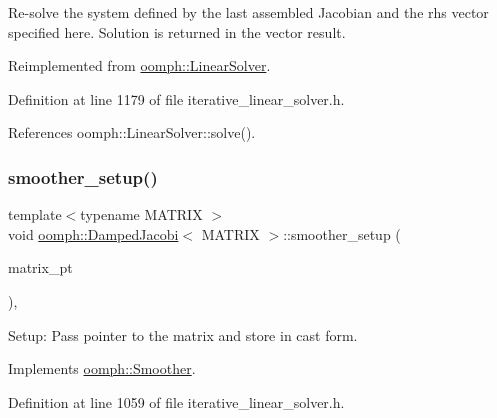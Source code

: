 Re-\/solve the system defined by the last assembled Jacobian and the rhs vector specified here. Solution is returned in the vector result. 



Reimplemented from \hyperlink{classoomph_1_1LinearSolver_a3b310d08333033edc119b2a5bd7dcbfb}{oomph\+::\+Linear\+Solver}.



Definition at line 1179 of file iterative\+\_\+linear\+\_\+solver.\+h.



References oomph\+::\+Linear\+Solver\+::solve().

\mbox{\label{classoomph_1_1DampedJacobi_a8f136ac45998419c70708166b16a66e1}} 
\subsubsection{\texorpdfstring{smoother\+\_\+setup()}{smoother\_setup()}}
{\footnotesize\ttfamily template$<$typename M\+A\+T\+R\+IX $>$ \\
void \hyperlink{classoomph_1_1DampedJacobi}{oomph\+::\+Damped\+Jacobi}$<$ M\+A\+T\+R\+IX $>$\+::smoother\+\_\+setup (\begin{DoxyParamCaption}\item[{\hyperlink{classoomph_1_1DoubleMatrixBase}{Double\+Matrix\+Base} $\ast$}]{matrix\+\_\+pt }\end{DoxyParamCaption})\hspace{0.3cm}{\ttfamily [inline]}, {\ttfamily [virtual]}}



Setup\+: Pass pointer to the matrix and store in cast form. 



Implements \hyperlink{classoomph_1_1Smoother_a6eb7009ab3bebcccc83062cbe980bf91}{oomph\+::\+Smoother}.



Definition at line 1059 of file iterative\+\_\+linear\+\_\+solver.\+h.

\mbox{\label{classoomph_1_1DampedJacobi_af1e5baec4c87874bbd2a2834810f92ba}} 
